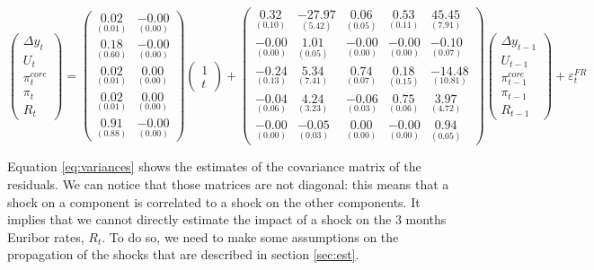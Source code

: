 \documentclass[
  10pt,
]{article}
\begin{document}
\begin{equation}
\begin{pmatrix}
 \Delta y_{t} \\
U_{t} \\
\pi^{core}_{t} \\
\pi_{t} \\
R_{t} 
\end{pmatrix} = \begin{pmatrix}
 \underset{(0.01)}{0.02} & \underset{(0.00)}{-0.00} \\
\underset{(0.60)}{0.18} & \underset{(0.00)}{-0.00} \\
\underset{(0.01)}{0.02} & \underset{(0.00)}{0.00} \\
\underset{(0.01)}{0.02} & \underset{(0.00)}{0.00} \\
\underset{(0.88)}{0.91} & \underset{(0.00)}{-0.00} 
\end{pmatrix} \begin{pmatrix} 1 \\ t \end{pmatrix}+\begin{pmatrix}
 \underset{(0.10)}{0.32} & \underset{(5.42)}{-27.97} & \underset{(0.05)}{0.06} & \underset{(0.11)}{0.53} & \underset{(7.91)}{45.45} \\
\underset{(0.00)}{-0.00} & \underset{(0.05)}{1.01} & \underset{(0.00)}{-0.00} & \underset{(0.00)}{-0.00} & \underset{(0.07)}{-0.10} \\
\underset{(0.13)}{-0.24} & \underset{(7.41)}{5.34} & \underset{(0.07)}{0.74} & \underset{(0.15)}{0.18} & \underset{(10.81)}{-14.48} \\
\underset{(0.06)}{-0.04} & \underset{(3.23)}{4.24} & \underset{(0.03)}{-0.06} & \underset{(0.06)}{0.75} & \underset{(4.72)}{3.97} \\
\underset{(0.00)}{-0.00} & \underset{(0.03)}{-0.05} & \underset{(0.00)}{0.00} & \underset{(0.00)}{-0.00} & \underset{(0.05)}{0.94} 
\end{pmatrix} \begin{pmatrix}
 \Delta y_{t - 1} \\
U_{t - 1} \\
\pi^{core}_{t - 1} \\
\pi_{t - 1} \\
R_{t - 1} 
\end{pmatrix}+ \varepsilon^{FR}_t
\label{eq:var-fr}
\end{equation}

Equation \eqref{eq:variances} shows the estimates of the covariance matrix of the residuals.
We can notice that those matrices are not diagonal: this means that a shock on a component is correlated to a shock on the other components.
It implies that we cannot directly estimate the impact of a shock on the 3 months Euribor rates, \(R_t\).
To do so, we need to make some assumptions on the propagation of the shocks that are described in section \ref{sec:est}.
\end{document}
